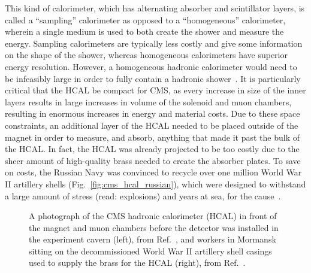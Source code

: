 This kind of calorimeter, which has alternating absorber and scintillator layers, is called a ``sampling'' calorimeter as opposed to a ``homogeneous'' calorimeter, wherein a single medium is used to both create the shower and measure the energy. 
Sampling calorimeters are typically less costly and give some information on the shape of the shower, whereas homogeneous calorimeters have superior energy resolution. 
However, a homogeneous hadronic calorimeter would need to be infeasibly large in order to fully contain a hadronic shower~\cite{KolanoskiWermesDetectors}. 
It is particularly critical that the HCAL be compact for CMS, as every increase in size of the inner layers results in large increases in volume of the solenoid and muon chambers, resulting in enormous increases in energy and material costs. 
Due to these space constraints, an additional layer of the HCAL needed to be placed outside of the magnet in order to measure, and absorb, anything that made it past the bulk of the HCAL. 
In fact, the HCAL was already projected to be too costly due to the sheer amount of high-quality brass needed to create the absorber plates. 
To save on costs, the Russian Navy was convinced to recycle over one million World War II artillery shells (Fig.~\ref{fig:cms_hcal_russian}), which were designed to withstand a large amount of stress (read: explosions) and years at sea, for the cause~\cite{CMSWebHCAL}. 

\begin{figure}[htb]
    \centering
    \quad
    \caption[A photograph of the CMS hadronic calorimeter (HCAL) and the World War II artillery shell casings that were melted down to supply the brass]{
        A photograph of the CMS hadronic calorimeter (HCAL) in front of the magnet and muon chambers before the detector was installed in the experiment cavern (left), from Ref.~\cite{Brice:1431485}, and workers in Mormansk sitting on the decommissioned World War II artillery shell casings used to supply the brass for the HCAL (right), from Ref.~\cite{GinterRussianDudes}.
    }
\end{figure}

